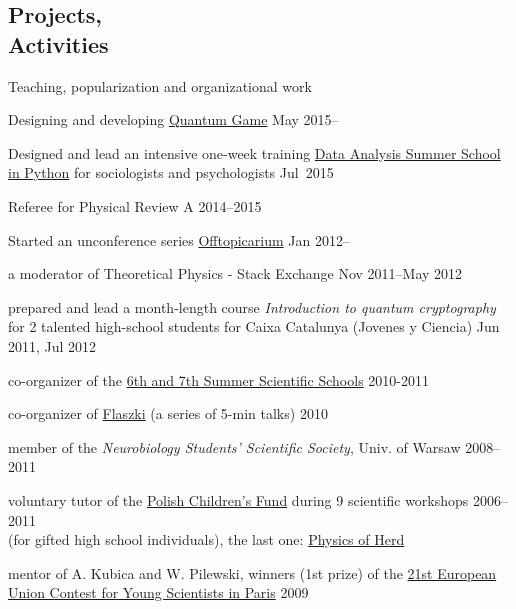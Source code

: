 \documentclass[margin,line]{resume}
\begin{document}
\begin{resume}
    \section{\mysidestyle Projects,\\Activities}
    Teaching, popularization and organizational work
        \begin{list2}
        \item Designing and developing \href{http://quantumgame.io/}{Quantum Game} \hfill {May 2015--}
        \item Designed and lead an intensive one-week training \href{http://www.delab.uw.edu.pl/szkola-letnia-dane-2015/}{Data Analysis Summer School in Python} for sociologists and psychologists \hfill { Jul~2015} 
        \item Referee for Physical Review A \hfill { 2014--2015}
        \item Started an unconference series \href{http://offtopicarium.wikidot.com/en:start}{Offtopicarium} \hfill { Jan 2012--}
	    \item a moderator of Theoretical Physics - Stack Exchange \hfill Nov 2011--May 2012
        \item prepared and lead a month-length course {\sl Introduction to quantum cryptography} for 2 talented high-school students for Caixa Catalunya (Jovenes y Ciencia) \hfill Jun 2011, Jul 2012
        \item co-organizer of the \href{http://warsztatywww.wikidot.com/en}{6th and 7th  Summer Scientific Schools} \hfill 2010-2011%
        \item co-organizer of \href{http://www.flaszki.waw.pl/}{Flaszki} (a series of 5-min talks) \hfill 2010
        \item member of the {\sl Neurobiology Students' Scientific Society}, Univ. of Warsaw  \hfill 2008--2011
        \item voluntary tutor of the \href{http://www.fundusz.org/?lang=gb}{Polish Children's Fund} during 9 scientific workshops \hfill 2006--2011\\
        (for gifted high school individuals), the last one: \href{http://migdal.wikidot.com/fizyka-stada}{Physics of Herd}
        \item mentor of A. Kubica and W. Pilewski, winners (1st prize) of the \href{http://www.eucys09.fr/}{21st European Union Contest for Young Scientists in Paris}  \hfill 2009

\end{list2}
\end{resume}
\end{document}
